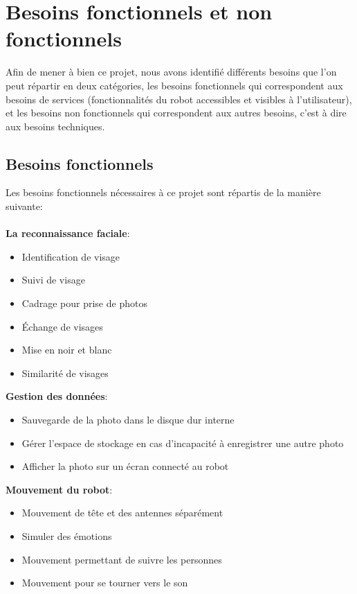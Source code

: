 \newpage

\section{Besoins fonctionnels et non fonctionnels} \label{sectionbesoins}
Afin de mener à bien ce projet, nous avons identifié différents besoins que l'on peut répartir en deux catégories, les besoins fonctionnels qui correspondent aux besoins de services (fonctionnalités du robot accessibles et visibles à l'utilisateur), et les besoins non fonctionnels qui correspondent aux autres besoins, c'est à dire aux besoins techniques.
\subsection{Besoins fonctionnels}
Les besoins fonctionnels nécessaires à ce projet sont répartis de la manière suivante: \\ \\
\textbf{La reconnaissance faciale}:
\begin{itemize}
    \item Identification de visage
    \item Suivi de visage
    \item Cadrage pour prise de photos
    \item Échange de visages
    \item Mise en noir et blanc
    \item Similarité de visages \\
\end{itemize}
\textbf{Gestion des données}:
\begin{itemize}
    \item Sauvegarde de la photo dans le disque dur interne
    \item Gérer l'espace de stockage en cas d'incapacité à enregistrer une autre photo
    \item Afficher la photo sur un écran connecté au robot  \\
\end{itemize}
\textbf{Mouvement du robot}:
\begin{itemize}
    \item Mouvement de tête et des antennes séparément
    \item Simuler des émotions
    \item Mouvement permettant de suivre les personnes
    \item Mouvement pour se tourner vers le son \\
\end{itemize}
